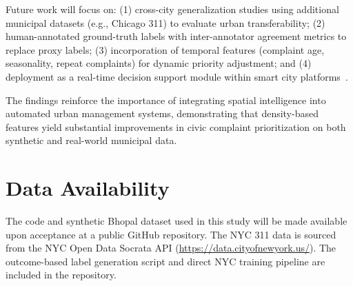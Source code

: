 \documentclass[conference]{IEEEtran}
\begin{document}
Future work will focus on: (1) cross-city generalization studies using additional municipal datasets (e.g., Chicago 311) to evaluate urban transferability; (2) human-annotated ground-truth labels with inter-annotator agreement metrics to replace proxy labels; (3) incorporation of temporal features (complaint age, seasonality, repeat complaints) for dynamic priority adjustment; and (4) deployment as a real-time decision support module within smart city platforms~\cite{gharaibeh2017smart}.

The findings reinforce the importance of integrating spatial intelligence into automated urban management systems, demonstrating that density-based features yield substantial improvements in civic complaint prioritization on both synthetic and real-world municipal data.

\section*{Data Availability}
The code and synthetic Bhopal dataset used in this study will be made available upon acceptance at a public GitHub repository. The NYC 311 data is sourced from the NYC Open Data Socrata API (\url{https://data.cityofnewyork.us/}). The outcome-based label generation script and direct NYC training pipeline are included in the repository.



\end{document}
